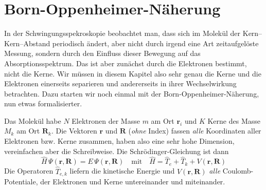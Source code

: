 \section{Born-Oppenheimer-Näherung}

In der Schwingungsspekroskopie beobachtet man, dass sich im Molekül der Kern--Kern--Abstand  periodisch ändert, aber nicht durch irgend eine Art zeitaufgelöste Messung, sondern durch den Einfluss dieser Bewegung auf das Absorptionsspektrum. Das ist aber zunächst durch die Elektronen bestimmt, nicht die Kerne. Wir müssen in diesem Kapitel also sehr genau die Kerne und die Elektronen einerseits separieren und andererseits in ihrer Wechselwirkung betrachten. Dazu starten wir noch einmal mit der Born-Oppenheimer-Näherung, nun etwas formalisierter.

Das Molekül habe $N$ Elektronen der Masse $m$ am Ort $\mathbf{r}_i$ und $K$ Kerne des Masse $M_k$ am Ort $\mathbf{R}_k$. Die Vektoren $\mathbf{r}$ und $\mathbf{R}$ (\emph{ohne} Index) fassen \emph{alle} Koordinaten aller Elektronen bzw. Kerne zusammen, haben also eine sehr hohe Dimension, vereinfachen aber die Schreibweise. Die Schrödinger-Gleichung ist dann
\begin{equation}
 \hat{H} \, \Psi (\mathbf{r}, \mathbf{R}) = E \, \Psi (\mathbf{r}, \mathbf{R}) \quad \text{mit} \quad
  \hat{H} =  \hat{T}_e + \hat{T}_k + V (\mathbf{r}, \mathbf{R}) 
  \label{eq:vib_SG_allg}
\end{equation}
Die Operatoren $\hat{T}_{e,k}$ liefern die kinetische Energie und  $ V (\mathbf{r}, \mathbf{R}) $ \emph{alle} Coulomb-Potentiale, der Elektronen und Kerne untereinander und miteinander.

